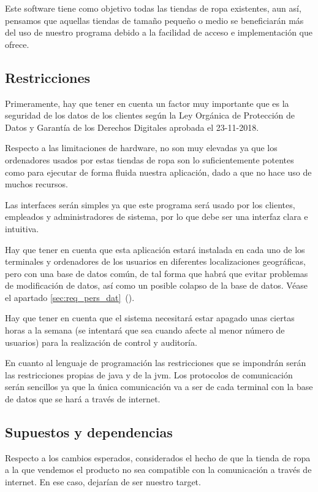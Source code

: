 Este software tiene como objetivo todas las tiendas de ropa existentes, aun así, pensamos
que aquellas tiendas de tamaño pequeño o medio se beneficiarán más del uso de
nuestro programa debido a la facilidad de acceso e implementación que ofrece.
\subsection{Restricciones}
Primeramente, hay que tener en cuenta un factor muy importante que es la seguridad
de los datos de los clientes según la Ley Orgánica de Protección de Datos y Garantía de
los Derechos Digitales aprobada el 23-11-2018.

Respecto a las limitaciones de hardware, no son muy elevadas ya que los ordenadores
usados por estas tiendas de ropa son lo suficientemente potentes como para ejecutar de forma fluida nuestra
aplicación, dado a que no hace uso de muchos recursos.

Las interfaces serán simples ya que este programa será usado por los clientes, empleados y
administradores de sistema, por lo que debe ser una interfaz clara e intuitiva.

Hay que tener en cuenta que esta aplicación estará instalada en cada uno de los
terminales y ordenadores de los usuarios en diferentes localizaciones geográficas, pero
con una base de datos común, de tal forma que habrá que evitar problemas de
modificación de datos, así como un posible colapso de la base de datos. Véase el apartado \ref{sec:req_pers_dat}~().

Hay que tener en cuenta que el sistema necesitará estar apagado unas ciertas horas a
la semana (se intentará que sea cuando afecte al menor número de usuarios) para la
realización de control y auditoría.

En cuanto al lenguaje de programación las restricciones que se impondrán serán las restricciones propias de java y de la \gls{jvm}.
Los protocolos de comunicación serán sencillos ya que la única comunicación va a ser
de cada terminal con la base de datos que se hará a través de internet.



\subsection{Supuestos y dependencias}
Respecto a los cambios esperados, considerados el hecho de que la tienda de ropa a
la que vendemos el producto no sea compatible con la comunicación a través de
internet. En ese caso, dejarían de ser nuestro target.

